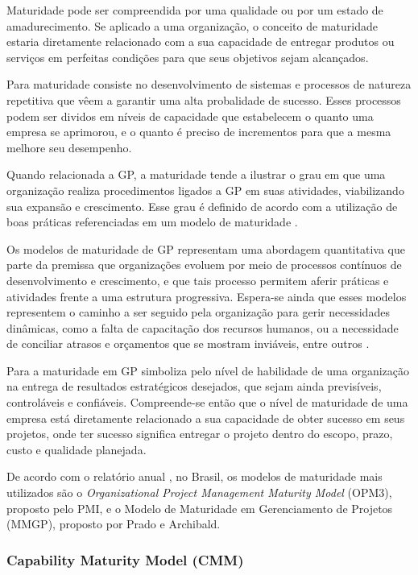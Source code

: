   Maturidade pode ser compreendida por uma qualidade ou por um estado de amadurecimento. Se aplicado a uma organização, o conceito de maturidade estaria diretamente relacionado com a sua capacidade de entregar produtos ou serviços em perfeitas condições para que seus objetivos sejam alcançados.

  Para  maturidade consiste no desenvolvimento de sistemas e processos de natureza repetitiva que vêem a garantir uma alta probalidade de sucesso. Esses processos podem ser dividos em níveis de capacidade que estabelecem o quanto uma empresa se aprimorou, e o quanto é preciso de incrementos para que a mesma melhore seu desempenho.

  Quando relacionada a GP, a maturidade tende a ilustrar o grau em que uma organização realiza procedimentos ligados a GP em suas atividades, viabilizando sua expansão e crescimento. Esse grau é definido de acordo com a utilização de boas práticas referenciadas em um modelo de maturidade \cite{fahrenkrog2003project}.

  Os modelos de maturidade de GP representam uma abordagem quantitativa que parte da premissa que organizações evoluem por meio de processos contínuos de desenvolvimento e crescimento, e que tais processo permitem aferir práticas e atividades frente a uma estrutura progressiva. Espera-se ainda que esses modelos representem o caminho a ser seguido pela organização para gerir necessidades dinâmicas, como a falta de capacitação dos recursos humanos, ou a necessidade de conciliar atrasos e orçamentos que se mostram inviáveis, entre outros \cite{de2013fatores}.

  Para  a maturidade em GP simboliza pelo nível de habilidade de uma organização na entrega de resultados estratégicos desejados, que sejam ainda previsíveis, controláveis e confiáveis. Compreende-se então que o nível de maturidade de uma empresa está diretamente relacionado a sua capacidade de obter sucesso em seus projetos, onde ter sucesso significa entregar o projeto dentro do escopo, prazo, custo e qualidade planejada.

  De acordo com o relatório anual , no Brasil, os modelos de maturidade mais utilizados são o \textit{Organizational Project Management Maturity Model} (OPM3), proposto pelo PMI, e o Modelo de Maturidade em Gerenciamento de Projetos (MMGP), proposto por Prado e Archibald.

  \subsubsection{Capability Maturity Model (CMM)}

